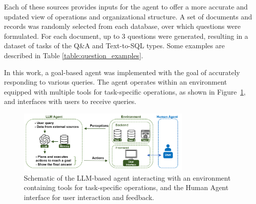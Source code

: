             Each of these sources provides inputs for the agent to offer a more accurate and updated view of operations and organizational structure.
            A set of documents and records was randomly selected from each database, over which questions were formulated. For each document, up to 3 questions were generated, resulting in a dataset of tasks of the Q\&A and Text-to-SQL types. Some examples are described in Table \ref{table:question_examples}.



            In this work, a goal-based agent \cite{Russell2020} was implemented with the goal of accurately responding to various queries. The agent operates within an environment equipped with multiple tools for task-specific operations, as shown in Figure~\ref{fig:agent_environment}, and interfaces with users to receive queries.
            
            \begin{figure}[h]
                \centering
                \includegraphics[width=0.75\textwidth]{images/agent_environment_4.png}
                \caption{Schematic of the LLM-based agent interacting with an environment containing tools for task-specific operations, and the Human Agent interface for user interaction and feedback.}
                \label{fig:agent_environment}
            \end{figure}           
            
